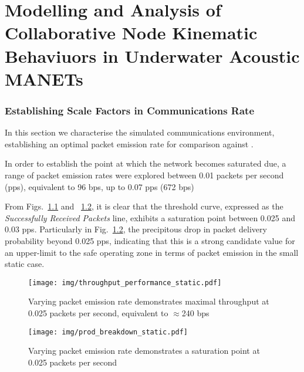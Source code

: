 

\chapter{Modelling and Analysis of Collaborative Node Kinematic Behaviuors in Underwater Acoustic MANETs} %
\label{Chapter\thechapter}



\subsection{Establishing Scale Factors in Communications Rate}

In this section we characterise the simulated communications environment, establishing an optimal packet emission rate for comparison against \cite{Guo11}.

In order to establish the point at which the network becomes saturated due, a range of packet emission rates were explored between 0.01 packets per second (pps), equivalent to 96 bps, up to 0.07 pps (672 bps)

From Figs.~\ref{fig:throughput_performance_static} and ~\ref{fig:prod_breakdown_static}, it is clear that the threshold curve, expressed as the \emph{Successfully Received Packets} line, exhibits a saturation point between 0.025 and 0.03 pps.
Particularly in Fig.~\ref{fig:prod_breakdown_static}, the precipitous drop in packet delivery probability beyond 0.025 pps, indicating that this is a strong candidate value for an upper-limit to the safe operating zone in terms of packet emission in the small static case.

\begin{figure}[H]
  \centering
  \texttt{[image: img/throughput\_performance\_static.pdf]}
  \caption{Varying packet emission rate demonstrates maximal throughput at 0.025 packets per second, equivalent to $\approx$240 bps}
  \label{fig:throughput_performance_static}
\end{figure}


\begin{figure}[H]
  \centering
  \texttt{[image: img/prod\_breakdown\_static.pdf]}
  \caption{Varying packet emission rate demonstrates a saturation point at 0.025 packets per second}
  \label{fig:prod_breakdown_static}
\end{figure}

